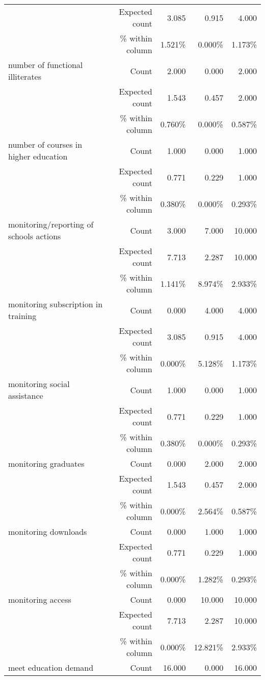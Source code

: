 \documentclass[6pt, oneside]{article}   	%
\begin{document}
\begin{table}[h]
{\begin{tabular}{lrrrr}
			 & Expected count & 3.085 & 0.915 & 4.000  \\
			 &  \% within column & 1.521\% & 0.000\% & 1.173\%  \\
			number of functional illiterates & Count & 2.000 & 0.000 & 2.000  \\
			 & Expected count & 1.543 & 0.457 & 2.000  \\
			 &  \% within column & 0.760\% & 0.000\% & 0.587\%  \\
			number of courses in higher education & Count & 1.000 & 0.000 & 1.000  \\
			 & Expected count & 0.771 & 0.229 & 1.000  \\
			 &  \% within column & 0.380\% & 0.000\% & 0.293\%  \\
			monitoring/reporting of schools actions & Count & 3.000 & 7.000 & 10.000  \\
			 & Expected count & 7.713 & 2.287 & 10.000  \\
			 &  \% within column & 1.141\% & 8.974\% & 2.933\%  \\
			monitoring subscription in training & Count & 0.000 & 4.000 & 4.000  \\
			 & Expected count & 3.085 & 0.915 & 4.000  \\
			 &  \% within column & 0.000\% & 5.128\% & 1.173\%  \\
			monitoring social assistance & Count & 1.000 & 0.000 & 1.000  \\
			 & Expected count & 0.771 & 0.229 & 1.000  \\
			 &  \% within column & 0.380\% & 0.000\% & 0.293\%  \\
			monitoring graduates & Count & 0.000 & 2.000 & 2.000  \\
			 & Expected count & 1.543 & 0.457 & 2.000  \\
			 &  \% within column & 0.000\% & 2.564\% & 0.587\%  \\
			monitoring downloads & Count & 0.000 & 1.000 & 1.000  \\
			 & Expected count & 0.771 & 0.229 & 1.000  \\
			 &  \% within column & 0.000\% & 1.282\% & 0.293\%  \\
			monitoring access & Count & 0.000 & 10.000 & 10.000  \\
			 & Expected count & 7.713 & 2.287 & 10.000  \\
			 &  \% within column & 0.000\% & 12.821\% & 2.933\%  \\
			meet education demand & Count & 16.000 & 0.000 & 16.000  \\

\end{tabular}}
\end{table}
\end{document}
